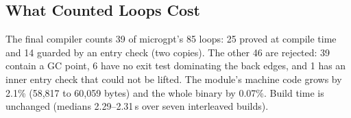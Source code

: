 \subsection{What Counted Loops Cost}
The final compiler counts 39 of microgpt's 85 loops: 25 proved at compile
time and 14 guarded by an entry check (two copies). The other 46 are rejected:
39 contain a GC point, 6 have no exit test dominating the back edges, and 1
has an inner entry check that could not be lifted. The module's machine code grows
by 2.1\% (58,817 to 60,059 bytes) and the whole binary by 0.07\%. Build time
is unchanged (medians 2.29--2.31\,s over seven interleaved builds).
